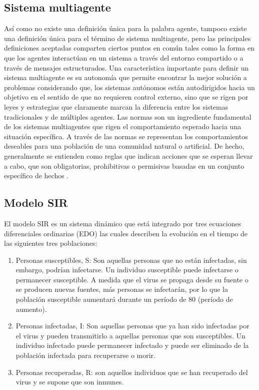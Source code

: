 \documentclass[final,6p,times,twocolumn]{elsarticle}
\begin{document}
\subsection{Sistema multiagente}
Así como no existe una definición única para la palabra agente, tampoco existe una definición única para el término de sistema multiagente, pero las principales definiciones aceptadas comparten ciertos puntos en común tales como la forma en que los agentes interactúan en un sistema a través del entorno compartido o a través de mensajes estructurados. Una característica importante para definir un sistema multiagente es su autonomía que permite encontrar la mejor solución a problemas considerando que, los sistemas autónomos están autodirigidos hacia un objetivo en el sentido de que no requieren control externo, sino que se rigen por leyes y estrategias que claramente marcan la diferencia entre los sistemas tradicionales y de múltiples agentes. Las normas son un ingrediente fundamental de los sistemas multiagentes que rigen el comportamiento esperado hacia una situación específica. A través de las normas se representan los comportamientos deseables para una población de una comunidad natural o artificial. De hecho, generalmente se entienden como reglas que indican acciones que se esperan llevar a cabo, que son obligatorias, prohibitivas o permisivas basadas en un conjunto específico de hechos \cite{Alfredo}.

\subsection{Modelo SIR}
El modelo SIR \cite{COOPER2020110057} es un sistema dinámico que está integrado por tres ecuaciones diferenciales ordinarias (EDO) las cuales describen la evolución en el tiempo de las siguientes tres poblaciones:
\begin{enumerate}
    \item Personas susceptibles, S: Son aquellas personas que no están infectadas, sin embargo, podrían infectarse.
Un individuo susceptible puede infectarse o permanecer susceptible. A medida que el virus se propaga desde su fuente o se producen nuevas fuentes, más personas se infectarán, por lo que la población susceptible aumentará durante un período de 80 (período de aumento).
    \item Personas infectadas, I: Son aquellas personas que ya han sido infectadas por el virus y pueden transmitirlo a aquellas personas que son susceptibles. Un individuo infectado puede permanecer infectado y puede ser eliminado de la población infectada para recuperarse o morir.
    \item Personas recuperadas, R: son aquellos individuos que se han recuperado del virus y se supone que son inmunes.
\end{enumerate}
\end{document}
